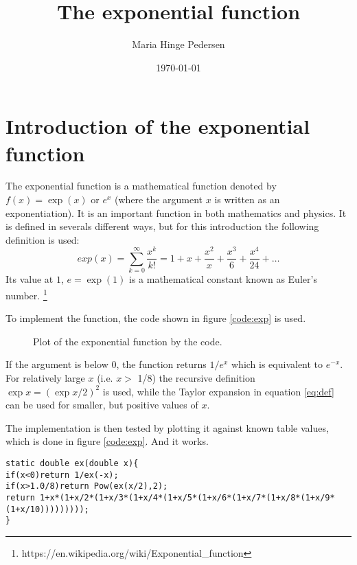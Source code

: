 \documentclass[a4paper,12pt]{article}
\begin{document}
\title{The exponential function}
\author{Maria Hinge Pedersen}
\date{\today}
\maketitle
\section{Introduction of the exponential function}
The exponential function is a mathematical function denoted by $f(x)=\exp(x)$ or $e^x$ (where the argument $x$ is written as an exponentiation).
It is an important function in both mathematics and physics.
It is defined in severals different ways, but for this introduction the following definition is used:
\begin{equation} \label{eq:def}
	exp(x) = \sum_{k=0}^{\infty} \frac{x^k}{k!}= 1+x+\frac{x^2}{x}+\frac{x^3}{6}+\frac{x^4}{24}+\ldots
\end{equation}
Its value at $1$, $e = \exp(1)$ is a mathematical constant known as Euler's number. \footnote{https://en.wikipedia.org/wiki/Exponential\_function} \

To implement the function, the code shown in figure \ref{code:exp} is used.

\begin{figure}\label{fig:plot}
	\centering
		
	\caption{Plot of the exponential function by the code.}
\end{figure}

If the argument is below $0$, the function returns $1/e^x$ which is equivalent to $e^{-x}$.
For relatively large $x$ (i.e. $x>$ 1/8) the recursive definition $\exp{x}=(\exp{x/2})^2$ is used, while the Taylor expansion in equation \ref{eq:def} can be used for smaller, but positive values of $x$.

The implementation is then tested by plotting it against known table values, which is done in figure \ref{code:exp}.
And it works.

\begin{lstlisting}[breaklines]
static double ex(double x){
if(x<0)return 1/ex(-x);
if(x>1.0/8)return Pow(ex(x/2),2);
return 1+x*(1+x/2*(1+x/3*(1+x/4*(1+x/5*(1+x/6*(1+x/7*(1+x/8*(1+x/9*(1+x/10)))))))));
}
\end{lstlisting} \label{code:exp}
\end{document}
